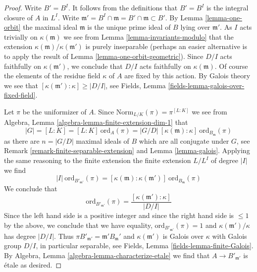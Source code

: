 \begin{proof}
Write $B' = B^I$. It follows from the definitions that $B' = B^I$
is the integral closure of $A$ in $L^I$. Write
$\mathfrak m' = B^I \cap \mathfrak m = B' \cap \mathfrak m \subset B'$.
By Lemma \ref{lemma-one-orbit} the maximal ideal $\mathfrak m$ is the
unique prime ideal of $B$ lying over $\mathfrak m'$.
As $I$ acts trivially on $\kappa(\mathfrak m)$ we see from
Lemma \ref{lemma-invariants-modulo} that the extension
$\kappa(\mathfrak m)/\kappa(\mathfrak m')$ is purely inseparable
(perhaps an easier alternative is to apply the result of
Lemma \ref{lemma-one-orbit-geometric}).
Since $D/I$ acts faithfully on $\kappa(\mathfrak m')$,
we conclude that $D/I$ acts faithfully on $\kappa(\mathfrak m)$.
Of course the elements of the residue field $\kappa$ of $A$
are fixed by this action.
By Galois theory we see that $[\kappa(\mathfrak m') : \kappa] \geq |D/I|$,
see Fields, Lemma \ref{fields-lemma-galois-over-fixed-field}.

\medskip\noindent
Let $\pi$ be the uniformizer of $A$. Since
$\text{Norm}_{L/K}(\pi) = \pi^{[L : K]}$ we see from
Algebra, Lemma \ref{algebra-lemma-finite-extension-dim-1}
that
$$
|G| = [L : K] = [L : K]\ \text{ord}_A(\pi) =
|G/D|\ [\kappa(\mathfrak m) : \kappa]\ \text{ord}_{B_\mathfrak m}(\pi)
$$
as there are $n = |G/D|$ maximal ideals of $B$ which are all
conjugate under $G$, see
Remark \ref{remark-finite-separable-extension} and
Lemma \ref{lemma-galois}.
Applying the same reasoning to the finite extension
the finite extension $L/L^I$ of degree $|I|$ we find
$$
|I|\ \text{ord}_{B'_{\mathfrak m'}}(\pi) =
[\kappa(\mathfrak m) : \kappa(\mathfrak m')]\ \text{ord}_{B_\mathfrak m}(\pi)
$$
We conclude that
$$
\text{ord}_{B'_{\mathfrak m'}}(\pi) =
\frac{[\kappa(\mathfrak m') : \kappa]}{|D/I|}
$$
Since the left hand side is a positive integer and since the right hand
side is $\leq 1$ by the above, we conclude that we have equality,
$\text{ord}_{B'_{\mathfrak m'}}(\pi) = 1$ and
$\kappa(\mathfrak m')/\kappa$ has degree $|D/I|$.
Thus $\pi B'_{\mathfrak m'} = \mathfrak m' B_\mathfrak m'$ and
$\kappa(\mathfrak m')$ is Galois over $\kappa$ with
Galois group $D/I$, in particular separable, see
Fields, Lemma \ref{fields-lemma-finite-Galois}.
By Algebra, Lemma \ref{algebra-lemma-characterize-etale}
we find that $A \to B'_{\mathfrak m'}$ is \'etale
as desired.
\end{proof}

